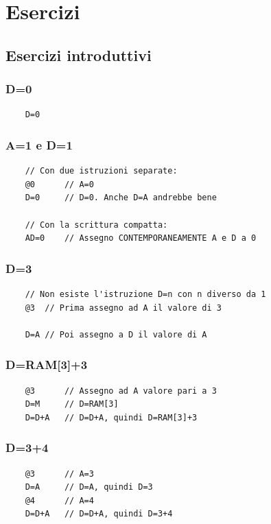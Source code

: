 \documentclass[12pt]{article}
\begin{document}
\pagebreak
\section{Esercizi}
\label{sec:exercises}

\subsection{Esercizi introduttivi}
\label{ssec:beginner_friendly}

\subsubsection{D=0}
\begin{lstlisting}
    D=0
\end{lstlisting}

\subsubsection{A=1 e D=1}
\begin{lstlisting}
    // Con due istruzioni separate:
    @0      // A=0
    D=0     // D=0. Anche D=A andrebbe bene

    // Con la scrittura compatta:
    AD=0    // Assegno CONTEMPORANEAMENTE A e D a 0
\end{lstlisting}

\subsubsection{D=3}
\begin{lstlisting}
    // Non esiste l'istruzione D=n con n diverso da 1
    @3  // Prima assegno ad A il valore di 3

    D=A // Poi assegno a D il valore di A
\end{lstlisting}

\subsubsection{D=RAM[3]+3}
\begin{lstlisting}
    @3      // Assegno ad A valore pari a 3
    D=M     // D=RAM[3]
    D=D+A   // D=D+A, quindi D=RAM[3]+3
\end{lstlisting}

\subsubsection{D=3+4}
\begin{lstlisting}
    @3      // A=3
    D=A     // D=A, quindi D=3
    @4      // A=4
    D=D+A   // D=D+A, quindi D=3+4
\end{lstlisting}
\end{document}
